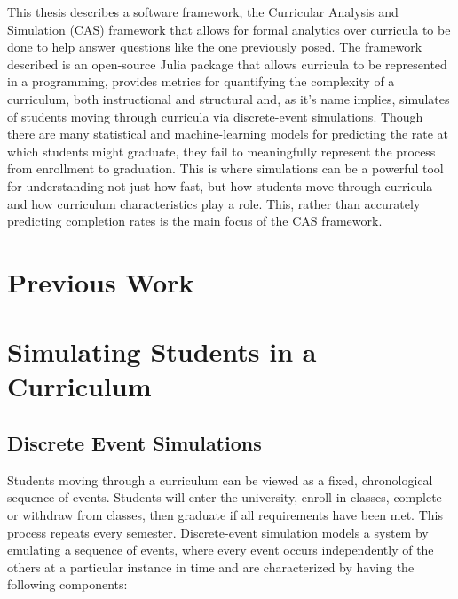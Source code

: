 \documentclass[botnum, fleqn]{unmeethesis}
\begin{document}
This thesis describes a software framework, the Curricular Analysis and Simulation (CAS) framework that allows for formal analytics over curricula to be done to help answer questions like the one previously posed. The framework described is an open-source Julia package that allows curricula to be represented in a programming, provides metrics for quantifying the complexity of a curriculum, both instructional and structural and, as it's name implies, simulates of students moving through curricula via discrete-event simulations. Though there are many statistical and machine-learning models for predicting the rate at which students might graduate, they fail to meaningfully represent the process from enrollment to graduation. This is where simulations can be a powerful tool for understanding not just how fast, but how students move through curricula and how curriculum characteristics play a role. This, rather than accurately predicting completion rates is the main focus of the CAS framework.


\chapter{Previous Work}


\chapter{Simulating Students in a Curriculum}

\section{Discrete Event Simulations}
Students moving through a curriculum can be viewed as a fixed, chronological sequence of events. Students will enter the university, enroll in classes, complete or withdraw from classes, then graduate if all requirements have been met. This process repeats every semester. Discrete-event simulation models a system by emulating a sequence of events, where every event occurs independently of the others at a particular instance in time and are characterized by having the following components:
\end{document}
